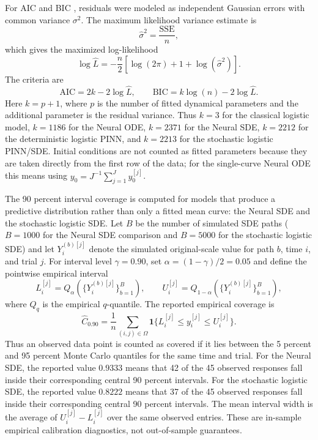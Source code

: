 \documentclass[11pt]{article}
\begin{document}
For AIC and BIC \citep{akaike1974newlook,schwarz1978estimating}, residuals were
modeled as independent Gaussian errors with
common variance $\sigma^2$. The maximum likelihood variance estimate is
$$
  \widehat\sigma^2 = \frac{\mathrm{SSE}}{n},
$$
which gives the maximized log-likelihood
$$
  \log \widehat L
  =
  -\frac{n}{2}
  \left[
    \log(2\pi)+1+\log(\widehat\sigma^2)
  \right].
$$
The criteria are
$$
  \mathrm{AIC}=2k-2\log\widehat L,
  \qquad
  \mathrm{BIC}=k\log(n)-2\log\widehat L.
$$
Here $k=p+1$, where $p$ is the number of fitted dynamical parameters and the
additional parameter is the residual variance. Thus $k=3$ for the classical
logistic model, $k=1186$ for the Neural ODE, $k=2371$ for the Neural SDE,
$k=2212$ for the deterministic logistic PINN, and $k=2213$ for the stochastic
logistic PINN/SDE.
Initial conditions are not counted as fitted parameters because they are taken
directly from the first row of the data; for the single-curve Neural ODE this
means using $y_0=J^{-1}\sum_{j=1}^J y_0^{[j]}$.

The 90 percent interval coverage is computed for models that produce a
predictive distribution rather than only a fitted mean curve: the Neural SDE
and the stochastic logistic SDE. Let $B$ be the number of simulated SDE paths
($B=1000$ for the Neural SDE comparison and $B=5000$ for the stochastic
logistic SDE) and let
$Y_i^{(b)[j]}$ denote the simulated original-scale value for path $b$, time
$i$, and trial $j$. For interval level $\gamma=0.90$, set
$\alpha=(1-\gamma)/2=0.05$ and define the pointwise empirical interval
$$
  L_i^{[j]}=Q_{\alpha}\left(\{Y_i^{(b)[j]}\}_{b=1}^B\right),
  \qquad
  U_i^{[j]}=Q_{1-\alpha}\left(\{Y_i^{(b)[j]}\}_{b=1}^B\right),
$$
where $Q_q$ is the empirical $q$-quantile. The reported empirical coverage is
$$
  \widehat C_{0.90}
  =
  \frac{1}{n}
  \sum_{(i,j)\in\Omega}
  \mathbf 1\{L_i^{[j]}\le y_i^{[j]}\le U_i^{[j]}\}.
$$
Thus an observed data point is counted as covered if it lies between the 5
percent and 95 percent Monte Carlo quantiles for the same time and trial. For
the Neural SDE, the reported value $0.9333$ means that 42 of the 45 observed
responses fall inside their corresponding central 90 percent intervals. For
the stochastic logistic SDE, the reported value $0.8222$ means that 37 of the
45 observed responses fall inside their corresponding central 90 percent
intervals. The mean interval width is the average of $U_i^{[j]}-L_i^{[j]}$ over
the same observed entries. These are in-sample empirical calibration
diagnostics, not out-of-sample guarantees.
\end{document}
